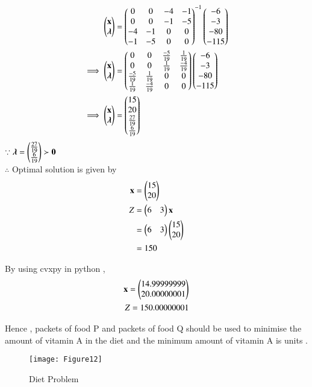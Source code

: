 \documentclass[journal,12pt,twocolumn]{IEEEtran}
\begin{document}
\begin{align}
    \begin{pmatrix}\mathbf{x} \\ \boldsymbol{\lambda}\end{pmatrix} &= \begin{pmatrix}0 & 0 & -4 & -1 \\ 0 & 0 & -1 & -5 \\ -4 & -1 & 0 & 0 \\ -1 & -5 & 0 & 0\end{pmatrix}^{-1}\begin{pmatrix}-6 \\ -3 \\ -80 \\ -115\end{pmatrix}
    \\
    \implies   \begin{pmatrix}\mathbf{x} \\ \boldsymbol{\lambda}\end{pmatrix} &= \begin{pmatrix}0 & 0 & \frac{-5}{19} & \frac{1}{19} \\ 0 & 0 & \frac{1}{19} & \frac{-4}{19} \\ \frac{-5}{19} & \frac{1}{19} & 0 & 0 \\ \frac{1}{19} & \frac{-4}{19} & 0 & 0\end{pmatrix}\begin{pmatrix}-6 \\ -3 \\ -80 \\ -115\end{pmatrix}
    \\
    \implies \begin{pmatrix}\mathbf{x} \\ \boldsymbol{\lambda}\end{pmatrix} &= \begin{pmatrix}15 \\ 20 \\ \frac{27}{19} \\ \frac{6}{19} \end{pmatrix}
\end{align}
$\because \boldsymbol{\lambda}=\begin{pmatrix}\frac{27}{19} \\ \frac{6}{19}\end{pmatrix} \succ \mathbf{0} $
\\
$\therefore$ Optimal solution is given by
\begin{align}
    \mathbf{x} &= \begin{pmatrix}15\\20\end{pmatrix} \\
    Z &= \begin{pmatrix}6 & 3\end{pmatrix}\mathbf{x} \\
    &= \begin{pmatrix}6 & 3\end{pmatrix}\begin{pmatrix}15 \\ 20\end{pmatrix} \\
    &= 150
\end{align}

By using cvxpy in python ,
\begin{align}
    \mathbf{x}=\begin{pmatrix}14.99999999\\20.00000001\end{pmatrix}\\
    Z = 150.00000001
\end{align}

Hence , packets of food P and  packets of food Q should be used to minimise the amount of vitamin A in the diet and the minimum amount of vitamin A is  units .

\begin{figure}[!ht]
\centering
\texttt{[image: Figure12]}
\caption{Diet Problem}
\label{fig:diet problem}	
\end{figure}
\end{document}
